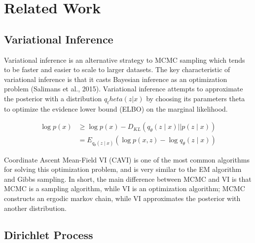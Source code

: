 \documentclass{article}
\begin{document}
\section{Related Work}
\subsection{Variational Inference}

Variational inference is an alternative strategy to MCMC sampling which tends to be faster and easier to scale to larger datasets. The key characteristic of variational inference is that it casts Bayesian inference as an optimization problem (Salimans et al., 2015). Variational inference attempts to approximate the posterior with a distribution $q_theta(z|x)$ by choosing its parameters theta to optimize the evidence lower bound (ELBO) on the marginal likelihood.

\begin{align*}
\log{p(x)} &\geq \log p(x) - D_{KL}(q_\theta(z\mid x)||p(z\mid x))\\
		   &= E_{q_\theta(z\mid x)}(\log p(x,z)-\log q_\theta (z\mid x))
\end{align*}

Coordinate Ascent Mean-Field VI (CAVI) is one of the most common algorithms for solving this optimization problem, and is very similar to the EM algorithm and Gibbs sampling. In short, the main difference between MCMC and VI is that MCMC is a sampling algorithm, while VI is an optimization algorithm; MCMC constructs an ergodic markov chain, while VI approximates the posterior with another distribution.

\subsection{Dirichlet Process }
\end{document}
